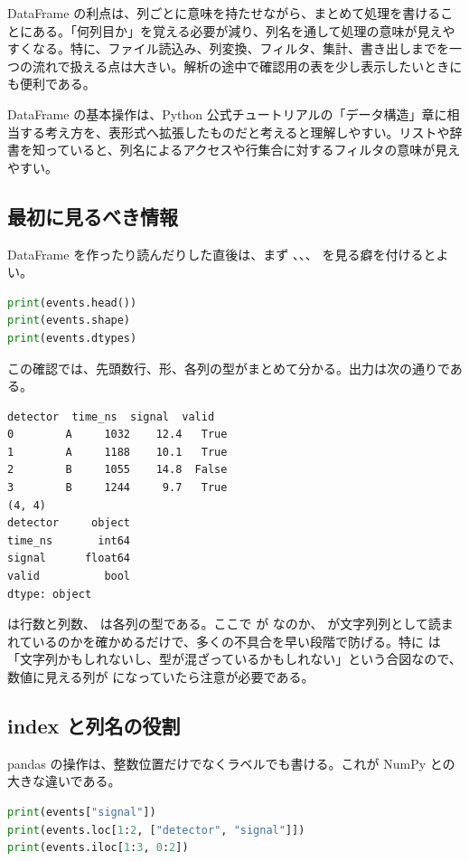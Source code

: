 DataFrame の利点は、列ごとに意味を持たせながら、まとめて処理を書けることにある。「何列目か」を覚える必要が減り、列名を通して処理の意味が見えやすくなる。特に、ファイル読込み、列変換、フィルタ、集計、書き出しまでを一つの流れで扱える点は大きい。解析の途中で確認用の表を少し表示したいときにも便利である。

DataFrame の基本操作は、Python 公式チュートリアルの「データ構造」章に相当する考え方を、表形式へ拡張したものだと考えると理解しやすい。リストや辞書を知っていると、列名によるアクセスや行集合に対するフィルタの意味が見えやすい。

\subsection{最初に見るべき情報}

DataFrame を作ったり読んだりした直後は、まず 、、、 を見る癖を付けるとよい。

\begin{lstlisting}[language=Python]
print(events.head())
print(events.shape)
print(events.dtypes)
\end{lstlisting}

この確認では、先頭数行、形、各列の型がまとめて分かる。出力は次の通りである。

\begin{lstlisting}[numbers=none, xleftmargin=2\zw]
  detector  time_ns  signal  valid
0        A     1032    12.4   True
1        A     1188    10.1   True
2        B     1055    14.8  False
3        B     1244     9.7   True
(4, 4)
detector     object
time_ns       int64
signal      float64
valid          bool
dtype: object
\end{lstlisting}

 は行数と列数、 は各列の型である。ここで  が  なのか、 が文字列列として読まれているのかを確かめるだけで、多くの不具合を早い段階で防げる。特に  は「文字列かもしれないし、型が混ざっているかもしれない」という合図なので、数値に見える列が  になっていたら注意が必要である。

\subsection{index と列名の役割}

pandas の操作は、整数位置だけでなくラベルでも書ける。これが NumPy との大きな違いである。

\begin{lstlisting}[language=Python]
print(events["signal"])
print(events.loc[1:2, ["detector", "signal"]])
print(events.iloc[1:3, 0:2])
\end{lstlisting}

